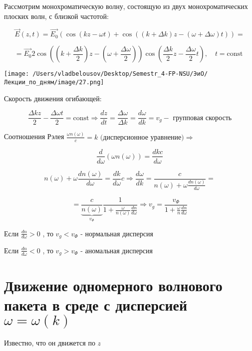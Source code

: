 \documentclass[12pt, a4paper]{report}
\begin{document}
Рассмотрим монохроматическую волну, состоящую из двух монохроматических плоских волн, с близкой частотой: 

\[ \vec{E }  (z, t ) = \vec{E_0 }(\cos (kz - \omega t )+ \cos  ( (k+ \Delta k)z - ( \omega +\Delta \omega )t))=\]

\[ = \vec{E_0 } 2 \cos \left( \left( k+ \frac{\Delta k}{2}  \right)z - \left( \omega + \frac{\Delta \omega}{2}  \right) \right) \cos \left(  \frac{\Delta k }{2} z - \frac{\Delta \omega }{2 }  t   \right), \quad t=\text{const }     \] 

\begin{center}
    \texttt{[image: /Users/vladbelousov/Desktop/Semestr\_4-FP-NSU/ЭиО/Лекции\_по\_дням/image/27.png]}
\end{center}

Скорость движения огибающей: 

\[ \frac{\Delta k z }{ 2 }  - \frac{\Delta \omega t }{2 }  = \mathrm{const }  \Rightarrow \frac{dz}{dt } = \frac{ \Delta \omega }{\Delta k } = \boxed {\frac{d \omega }{ dk }  = v_{g}} - \text{ групповая скорость}     \] 

Соотношения Рэлея \( \displaystyle \frac{\omega n( \omega)}{c }  = k \text{ (дисперсионное уравнение)} \Rightarrow   \) 

\[ \frac{d}{d \omega} ( \omega n ( \omega)) = \frac{ dk c }{d \omega } \] 

\[  n(\omega ) + \omega \frac{dn( \omega )}{d \omega } = \frac{dk}{d \omega } c \Rightarrow   \frac{d \omega } {dk } = \frac{ c }{ n( \omega ) + \omega \frac{ dn (\omega)}{d \omega} }  =       \] 

\[ =\underbrace{ \frac{c}{ n ( \omega )}}_{v_{\Phi } } \frac{1}{ 1+ \frac{\omega}{n ( \omega )}\frac{dn}{d \omega}  }  \Rightarrow v_g = \frac{v_{\Phi} } {1+ \frac{\omega}{ n } \frac{dn}{d \omega}  }   \] 

Если \( \displaystyle  \frac{dn}{d \omega }> 0   \) , то \( v_g< v_{\Phi}  \) - нормальная дисперсия

Если  \( \displaystyle  \frac{dn}{d \omega }< 0   \) , то \( v_g>v_{\Phi}  \) - аномальная дисперсия

\section{Движение одномерного волнового пакета в среде с дисперсией \( \omega = \omega( k ) \) }

Известно, что он движется по \( z \) 
\end{document}
